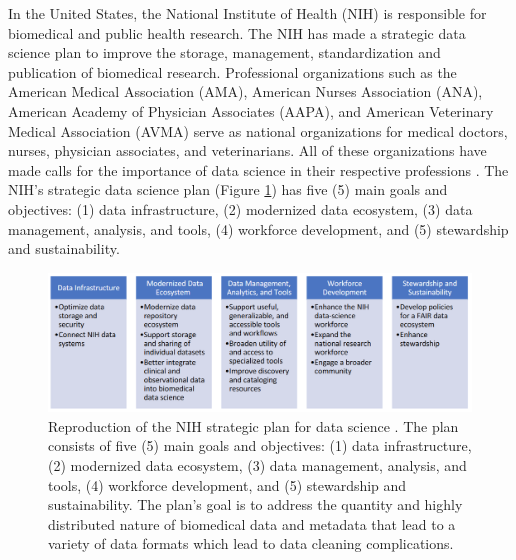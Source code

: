 \documentclass[010-intro.tex]{subfiles}
\begin{document}
In the United States,
the National Institute of Health (NIH) is responsible for biomedical and public health research.
The NIH has made a strategic data science plan to improve the
storage, management, standardization and publication of biomedical research.
Professional organizations such as the
American Medical Association (AMA),
American Nurses Association (ANA),
American Academy of Physician Associates (AAPA), and
American Veterinary Medical Association (AVMA)
serve as national organizations for medical doctors, nurses, physician associates, and veterinarians.
All of these organizations have made calls for the importance of data science in their respective professions
\cite{payneBiomedicalInformaticsMeets2018, americanmedicalassociationAcceleratingChangeMedical2021, americannursesassociationANAEnterpriseAmerican, owenEthicalIntersectionHealthcare2017, nolenArtificialIntelligenceVeterinary2020, nationalinstitutesofhealthNIHStrategicPlan2020}.
The NIH's strategic data science plan (Figure \ref{fig:nih-ds}) has five (5) main goals and objectives:
(1) data infrastructure,
(2) modernized data ecosystem,
(3) data management, analysis, and tools,
(4) workforce development, and
(5) stewardship and sustainability.

\begin{figure}[!hbtp]
    \centering
    \includegraphics[width=\linewidth]{figs/050-intro/nih-strategic_plan_data_science}
    \caption[NIH Strategic Plan for Data Science]{
    Reproduction of the NIH strategic plan for data science \cite{nationalinstitutesofhealthNIHStrategicPlan2020}.
    The plan consists of five (5) main goals and objectives: (1) data infrastructure,
    (2) modernized data ecosystem,
    (3) data management, analysis, and tools,
    (4) workforce development, and
    (5) stewardship and sustainability.
    The plan's goal is to address the quantity and highly distributed nature of biomedical data and metadata
    that lead to a variety of data formats which lead to data cleaning complications.
    }
    \label{fig:nih-ds}
\end{figure}
\end{document}
